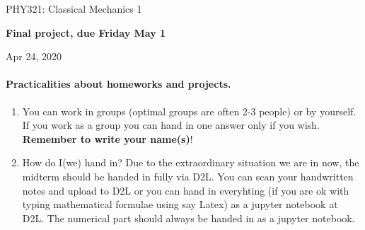 \documentclass[%
oneside,                 %
final,                   %
10pt]{article}
\begin{document}

\newcommand{\exercisesection}[1]{\subsection*{#1}}






\thispagestyle{empty}

\begin{center}
{\LARGE\bf
\begin{spacing}{1.25}
PHY321: Classical Mechanics 1
\end{spacing}
}
\end{center}


\begin{center}
{\bf Final  project, due Friday May 1${}^{}$} \\ [0mm]
\end{center}

\begin{center}
\end{center}
    

\begin{center}
Apr 24, 2020
\end{center}

\vspace{1cm}


\paragraph{Practicalities about  homeworks and projects.}
\begin{enumerate}
\item You can work in groups (optimal groups are often 2-3 people) or by yourself. If you work as a group you can hand in one answer only if you wish. \textbf{Remember to write your name(s)}!

\item How do I(we)  hand in?  Due to the extraordinary situation we are in now, the midterm should be handed in fully via D2L. You can scan your handwritten notes and upload to D2L or you can hand in everyhting (if you are ok with typing mathematical formulae using say Latex) as a jupyter notebook at D2L. The numerical part should always be handed in as a jupyter notebook.
\end{enumerate}
\end{document}

